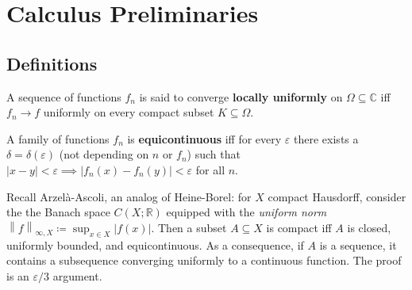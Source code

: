 
\hypertarget{calculus-preliminaries}{%
\section{Calculus Preliminaries}\label{calculus-preliminaries}}

\hypertarget{definitions}{%
\subsection{Definitions}\label{definitions}}

\begin{definition}

A sequence of functions \(f_n\) is said to converge \textbf{locally
uniformly} on \(\Omega \subseteq {\mathbb{C}}\) iff \(f_n\to f\)
uniformly on every compact subset \(K \subseteq \Omega\).

\end{definition}

\begin{definition}

A family of functions \(f_n\) is \textbf{equicontinuous} iff for every
\({\varepsilon}\) there exists a \(\delta = \delta({\varepsilon})\) (not
depending on \(n\) or \(f_n\)) such that
\({\left\lvert {x-y} \right\rvert}<{\varepsilon}\implies {\left\lvert {f_n(x) - f_n(y)} \right\rvert} < {\varepsilon}\)
for all \(n\).

\end{definition}

\begin{remark}

Recall Arzelà-Ascoli, an analog of Heine-Borel: for \(X\) compact
Hausdorff, consider the the Banach space \(C(X; {\mathbb{R}})\) equipped
with the \emph{uniform norm}
\({\left\lVert {f} \right\rVert}_{\infty, X} \coloneqq\sup_{x\in X} {\left\lvert {f(x)} \right\rvert}\).
Then a subset \(A \subseteq X\) is compact iff \(A\) is closed,
uniformly bounded, and equicontinuous. As a consequence, if \(A\) is a
sequence, it contains a subsequence converging uniformly to a continuous
function. The proof is an \({\varepsilon}/3\) argument.

\end{remark}

\begin{definition}

\end{definition}

